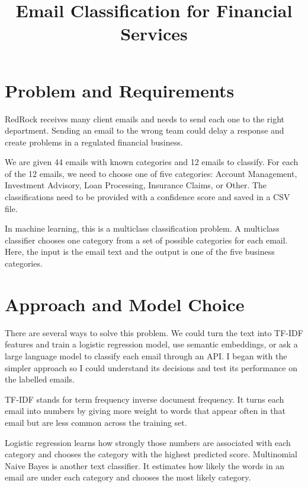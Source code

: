 \documentclass[conference]{IEEEtran}
\begin{document}
\title{Email Classification for Financial Services}

\author{
}

\maketitle

\setlength{\parindent}{0pt}
\setlength{\parskip}{0.5\baselineskip}

\section{Problem and Requirements}
RedRock receives many client emails and needs to send each one to the right department. Sending an email to the wrong team could delay a response and create problems in a regulated financial business.

We are given 44 emails with known categories and 12 emails to classify. For each of the 12 emails, we need to choose one of five categories: Account Management, Investment Advisory, Loan Processing, Insurance Claims, or Other. The classifications need to be provided with a confidence score and saved in a CSV file.

In machine learning, this is a multiclass classification problem. A multiclass classifier chooses one category from a set of possible categories for each email. Here, the input is the email text and the output is one of the five business categories.

\section{Approach and Model Choice}
There are several ways to solve this problem. We could turn the text into TF-IDF features and train a logistic regression model, use semantic embeddings, or ask a large language model to classify each email through an API. I began with the simpler approach so I could understand its decisions and test its performance on the labelled emails.

TF-IDF stands for term frequency inverse document frequency. It turns each email into numbers by giving more weight to words that appear often in that email but are less common across the training set.

Logistic regression learns how strongly those numbers are associated with each category and chooses the category with the highest predicted score. Multinomial Naive Bayes is another text classifier. It estimates how likely the words in an email are under each category and chooses the most likely category.
\end{document}
